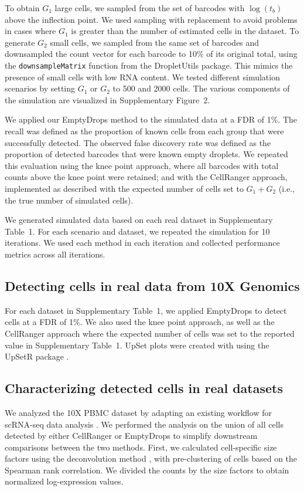 \documentclass[10pt,letterpaper]{article}
\newcommand{\code}[1]{\texttt{#1}}
\newcommand{\supptabdataset}{1}
\newcommand{\suppfigsimdesign}{2}
\begin{document}
To obtain $G_1$ large cells, we sampled from the set of barcodes with $\log(t_b)$ above the inflection point.
We used sampling with replacement to avoid problems in cases where $G_1$ is greater than the number of estimated cells in the dataset.
To generate $G_2$ small cells, we sampled from the same set of barcodes and downsampled the count vector for each barcode to 10\% of its original total,
using the \code{downsampleMatrix} function from the \textsf{DropletUtils} package.
This mimics the presence of small cells with low RNA content. 
We tested different simulation scenarios by setting $G_1$ or $G_2$ to 500 and 2000 cells.
The various components of the simulation are visualized in Supplementary Figure~\suppfigsimdesign{}.

We applied our EmptyDrops method to the simulated data at a FDR of 1\%. 
The recall was defined as the proportion of known cells from each group that were successfully detected.
The observed false discovery rate was defined as the proportion of detected barcodes that were known empty droplets.
We repeated this evaluation using the knee point approach, where all barcodes with total counts above the knee point were retained;
and with the CellRanger approach, implemented as described \cite{zheng2017massively} with the expected number of cells set to $G_1+G_2$ (i.e., the true number of simulated cells).

We generated simulated data based on each real dataset in Supplementary Table~\supptabdataset{}.
For each scenario and dataset, we repeated the simulation for 10 iterations.
We used each method in each iteration and collected performance metrics across all iterations.

\subsection*{Detecting cells in real data from 10X Genomics}
For each dataset in Supplementary Table~\supptabdataset{}, we applied EmptyDrops to detect cells at a FDR of 1\%. 
We also used the knee point approach, as well as the CellRanger approach where the expected number of cells was set to the reported value in Supplementary Table~\supptabdataset{}.
UpSet plots were created with using the \textsf{UpSetR} package \cite{lex2014upset}.

\subsection*{Characterizing detected cells in real datasets}
We analyzed the 10X PBMC dataset by adapting an existing workflow for scRNA-seq data analysis \cite{lun2016stepbystep}.
We performed the analysis on the union of all cells detected by either CellRanger or EmptyDrops to simplify downstream comparisons between the two methods.
First, we calculated cell-specific size factors using the deconvolution method \cite{lun2016pooling}, with pre-clustering of cells based on the Spearman rank correlation.
We divided the counts by the size factors to obtain normalized log-expression values.
\end{document}
